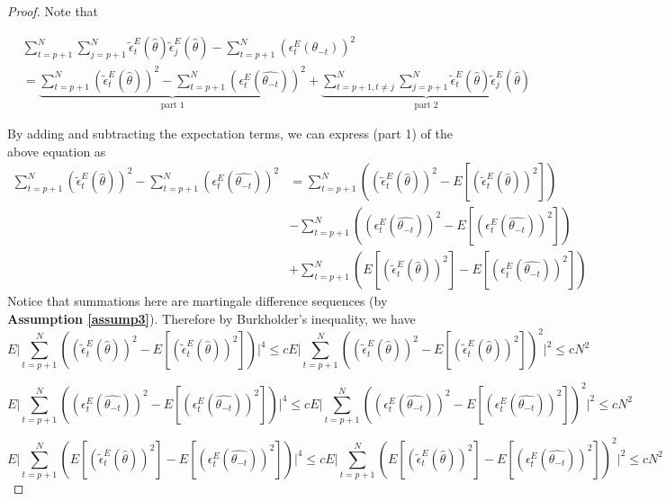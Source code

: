 \documentclass[12pt, oneside]{amsart}
\theoremstyle{definition}
\theoremstyle{remark}
\numberwithin{equation}{section}
\begin{document}
\begin{proof}
Note that 

\begin{align*}
    &\sum_{t=p+1}^N \sum_{j=p+1}^N   \tilde{\epsilon}^E_t(\hat{\theta}) \tilde{\epsilon}^E_j(\hat{\theta}) - \sum_{t=p+1}^N  \left( \epsilon^E_t(\theta_{-t}) \right)^2 \\
    &= \underbrace{\sum_{t=p+1}^N (\tilde{\epsilon}^E_t(\hat{\theta}))^2 - \sum_{t=p+1}^N ( \epsilon^E_t(\hat{\theta_{-t}})) ^2}_\text{part 1} + \underbrace{\sum^N_{t=p+1, t\not = j} \sum^N_{j=p+1} \tilde{\epsilon}^E_t(\hat{\theta}) \tilde{\epsilon}^E_j(\hat{\theta})}_\text{part 2}
\end{align*} 

By adding and subtracting the expectation terms, we can express (part 1) of the above equation as
\begin{align*}
    \sum_{t=p+1}^N (\tilde{\epsilon}^E_t(\hat{\theta}))^2 - \sum_{t=p+1}^N ( \epsilon^E_t(\hat{\theta_{-t}})) ^2 
    & = \sum_{t=p+1}^N \left( (\tilde{\epsilon}^E_t(\hat{\theta}))^2 - E[(\tilde{\epsilon}^E_t(\hat{\theta}))^2] \right) \\
    &- \sum_{t=p+1}^N \left( ( \epsilon^E_t(\hat{\theta_{-t}}))^2 - E[( \epsilon^E_t(\hat{\theta_{-t}}))^2] \right) \\
    &+ \sum^N_{t=p+1} \left( E[(\tilde{\epsilon}^E_t(\hat{\theta}))^2] - E[( \epsilon^E_t(\hat{\theta_{-t}}))^2] \right)
\end{align*}
Notice that summations here are martingale difference sequences (by \textbf{Assumption \ref{assump3}}). Therefore by Burkholder's inequality, we have 
$$ E \Bigg|
\sum_{t=p+1}^N \left( (\tilde{\epsilon}^E_t(\hat{\theta}))^2 - E[(\tilde{\epsilon}^E_t(\hat{\theta}))^2] \right) \Bigg| ^4 \leq 
 cE \Bigg|
\sum_{t=p+1}^N \left( (\tilde{\epsilon}^E_t(\hat{\theta}))^2 - E[(\tilde{\epsilon}^E_t(\hat{\theta}))^2] \right)^2 \Bigg| ^2 \leq cN^2 $$

$$ E \Bigg|
\sum_{t=p+1}^N \left( ( \epsilon^E_t(\hat{\theta_{-t}}))^2 - E[( \epsilon^E_t(\hat{\theta_{-t}}))^2] \right) \Bigg| ^4 \leq 
 cE \Bigg|
\sum_{t=p+1}^N \left( ( \epsilon^E_t(\hat{\theta_{-t}}))^2 - E[( \epsilon^E_t(\hat{\theta_{-t}}))^2] \right)^2 \Bigg| ^2 \leq cN^2
$$

$$ E \Bigg|
\sum_{t=p+1}^N \left( E[(\tilde{\epsilon}^E_t(\hat{\theta}))^2] - E[( \epsilon^E_t(\hat{\theta_{-t}}))^2] \right) \Bigg| ^4 \leq 
 cE \Bigg|
\sum_{t=p+1}^N \left( E[(\tilde{\epsilon}^E_t(\hat{\theta}))^2] - E[( \epsilon^E_t(\hat{\theta_{-t}}))^2] \right)^2 \Bigg| ^2 \leq cN^2
$$


\end{proof}
\end{document}
